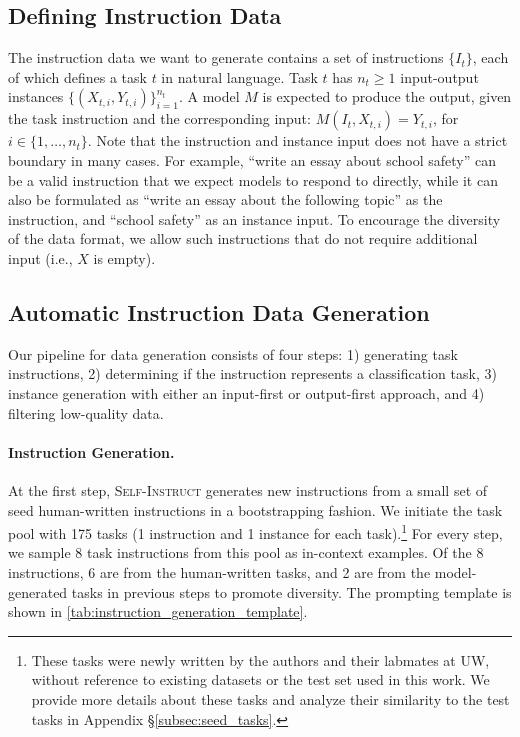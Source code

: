 \subsection{Defining Instruction Data}
\label{subsec:instruction-data-definition}

The instruction data we want to generate contains a set of instructions $\{I_t\}$, each of which defines a task $t$ in natural language. Task $t$ has $n_t \ge 1$ input-output instances $\{(X_{t,i}, Y_{t,i})\}_{i=1}^{n_t}$.
A model $M$ is expected to produce the output, given the task instruction and the corresponding input: $M(I_t, X_{t,i}) = Y_{t,i}$, for $i \in \{1,\ldots,n_t\}$.
Note that the instruction and instance input does not have a strict boundary in many cases. For example, ``write an essay about school safety'' can be a valid instruction that we expect models to respond to directly, while it can also be formulated as ``write an essay about the following topic'' as the instruction, and ``school safety'' as an instance input. To encourage the diversity of the data format, we allow such instructions that do not require additional input (i.e., $X$ is empty).

\subsection{Automatic Instruction Data Generation}
\label{subsec:data-generation}

Our pipeline for data generation consists of four steps: 1) generating task instructions, 2) determining if the instruction represents a classification task, 3) instance generation with either an input-first or output-first approach, and 4) filtering low-quality data.

\paragraph{Instruction Generation.} At the first step, \textsc{Self-Instruct} generates new instructions from a small set of seed human-written instructions in a bootstrapping fashion. We initiate the task pool with 175 tasks (1 instruction and 1 instance for each task).\footnote{These tasks were newly written by the authors and their labmates at UW, without reference to existing datasets or the test set used in this work. We provide more details about these tasks and analyze their similarity to the test tasks in Appendix \S\ref{subsec:seed_tasks}.} For every step, we sample 8 task instructions from this pool as in-context examples. Of the 8 instructions, 6 are from the human-written tasks, and 2 are from the model-generated tasks in previous steps to promote diversity. The prompting template is shown in \autoref{tab:instruction_generation_template}.

